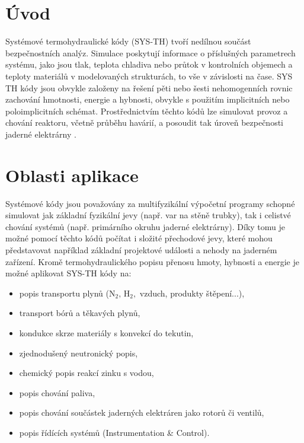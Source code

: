 
\section{Úvod}
Systémové termohydraulické kódy (SYS-TH) tvoří nedílnou součást bezpečnostních analýz. Simulace poskytují informace o příslušných parametrech systému, jako jsou tlak, teplota chladiva nebo průtok v kontrolních objemech a teploty materiálů v modelovaných strukturách, to vše v závislosti na čase. SYS TH kódy jsou obvykle založeny na řešení pěti nebo šesti nehomogenních rovnic zachování hmotnosti, energie a hybnosti, obvykle s použitím implicitních nebo poloimplicitních schémat. Prostřednictvím těchto kódů lze simulovat provoz a chování reaktoru, včetně průběhu havárií, a posoudit tak úroveň bezpečnosti jaderné elektrárny \cite{bestion2017structure, petruzzi2008thermal}.

\section{Oblasti aplikace}
Systémové kódy jsou považovány za multifyzikální výpočetní programy schopné simulovat jak základní fyzikální jevy (např. var na stěně trubky), tak i celistvé chování systémů (např. primárního okruhu jaderné elektrárny). Díky tomu je možné pomocí těchto kódů počítat i složité přechodové jevy, které mohou představovat například základní projektové události a nehody na jaderném zařízení. Kromě termohydraulického popisu přenosu hmoty, hybnosti a energie je možné aplikovat SYS-TH kódy na:
\begin{itemize}
	\item popis transportu plynů ($ \text{N}_{2},\,\text{H}_{2},$ vzduch, produkty štěpení...),
	\item transport bórů a těkavých plynů,
	\item kondukce skrze materiály s konvekcí do tekutin,
	\item zjednodušený neutronický popis,
	\item chemický popis reakcí zinku s vodou,
	\item popis chování paliva,
	\item popis chování součástek jaderných elektráren jako rotorů či ventilů,
	\item popis řídících systémů (Instrumentation \& Control).
	
\end{itemize}

